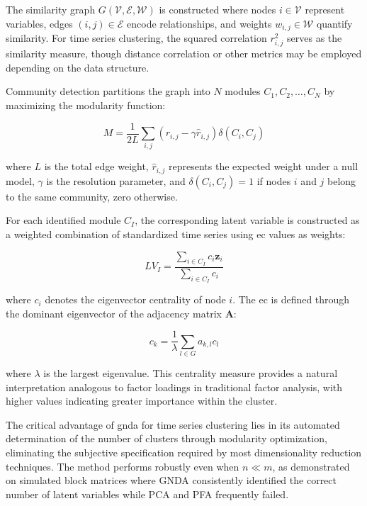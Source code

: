 \documentclass[preprint, 3p,
authoryear]{elsarticle} %
\begin{document}
The similarity graph \(G(\mathcal{V}, \mathcal{E}, \mathcal{W})\) is
constructed where nodes \(i \in \mathcal{V}\) represent variables, edges
\((i,j) \in \mathcal{E}\) encode relationships, and weights
\(w_{i,j} \in \mathcal{W}\) quantify similarity. For time series
clustering, the squared correlation \(r_{i,j}^2\) serves as the
similarity measure, though distance correlation or other metrics may be
employed depending on the data structure.

Community detection partitions the graph into \(N\) modules
\(C_1, C_2, \ldots, C_N\) by maximizing the modularity function:

\begin{equation}
M = \frac{1}{2L}\sum_{i,j}\left(r_{i,j} - \gamma \hat{r}_{i,j}\right)\delta(C_i, C_j)
\end{equation}

where \(L\) is the total edge weight, \(\hat{r}_{i,j}\) represents the
expected weight under a null model, \(\gamma\) is the resolution
parameter, and \(\delta(C_i, C_j) = 1\) if nodes \(i\) and \(j\) belong
to the same community, zero otherwise.

For each identified module \(C_I\), the corresponding latent variable is
constructed as a weighted combination of standardized time series using
\gls{ec} values as weights:

\begin{equation}
LV_I = \frac{\sum_{i \in C_I} c_i \mathbf{z}_i}{\sum_{i \in C_I} c_i}
\end{equation}

where \(c_i\) denotes the eigenvector centrality of node \(i\). The
\gls{ec} is defined through the dominant eigenvector of the adjacency
matrix \(\mathbf{A}\):

\begin{equation}
c_k = \frac{1}{\lambda}\sum_{l \in G} a_{k,l} c_l
\end{equation}

where \(\lambda\) is the largest eigenvalue. This centrality measure
provides a natural interpretation analogous to factor loadings in
traditional factor analysis, with higher values indicating greater
importance within the cluster.

The critical advantage of \gls{gnda} for time series clustering lies in
its automated determination of the number of clusters through modularity
optimization, eliminating the subjective specification required by most
dimensionality reduction techniques. The method performs robustly even
when \(n \ll m\), as demonstrated on simulated block matrices where GNDA
consistently identified the correct number of latent variables while PCA
and PFA frequently failed.
\end{document}
